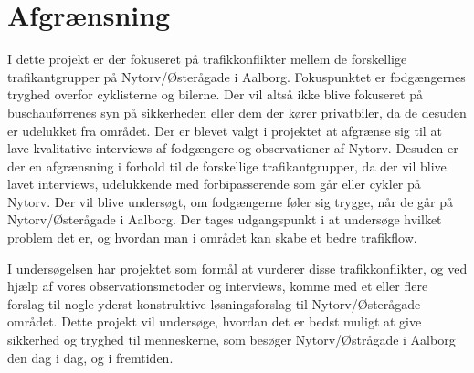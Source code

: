 \section{Afgrænsning}
\label{sec:afgraensning}

I dette projekt er der fokuseret på trafikkonflikter mellem de forskellige trafikantgrupper på Nytorv/Østerågade i Aalborg. Fokuspunktet er fodgængernes tryghed overfor cyklisterne og bilerne. Der vil altså ikke blive fokuseret på buschauførrenes syn på sikkerheden eller dem der kører privatbiler, da de desuden er udelukket fra området. Der er blevet valgt i projektet at afgrænse sig til at lave kvalitative interviews af fodgængere og observationer af Nytorv. Desuden er der en afgrænsning i forhold til de forskellige trafikantgrupper, da der vil blive lavet interviews, udelukkende med forbipasserende som går eller cykler på Nytorv. Der vil blive undersøgt, om fodgængerne føler sig trygge, når de går på Nytorv/Østerågade i Aalborg. Der tages udgangspunkt i at undersøge hvilket problem det er, og hvordan man i området kan skabe et bedre trafikflow.

I undersøgelsen har projektet som formål at vurderer disse trafikkonflikter, og ved hjælp af vores observationsmetoder og interviews, komme med et eller flere forslag til nogle yderst konstruktive løsningsforslag til Nytorv/Østerågade området.  Dette projekt vil undersøge, hvordan det er bedst muligt at give sikkerhed og tryghed til menneskerne, som besøger Nytorv/Østrågade i Aalborg den dag i dag, og i fremtiden. 
